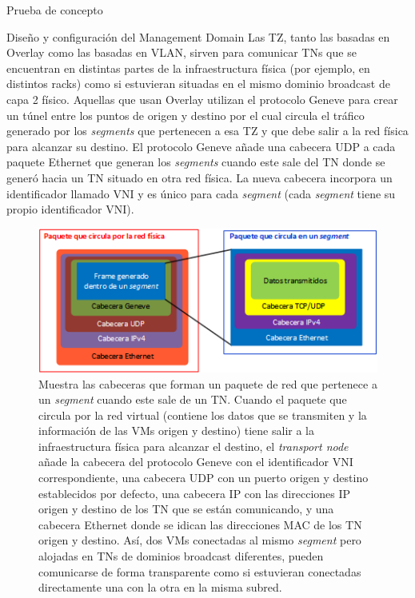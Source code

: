 \begin{section}{Prueba de concepto}
\begin{subsection}{Diseño y configuración del Management Domain}
    Las TZ, tanto las basadas en Overlay como las basadas en VLAN, sirven para comunicar TNs que se encuentran en distintas partes de la infraestructura física (por ejemplo, en distintos racks) como si estuvieran situadas en el mismo dominio broadcast de capa 2 físico. 
    Aquellas que usan Overlay utilizan el protocolo Geneve para crear un túnel entre los puntos de origen y destino por el cual circula el tráfico generado por los \textit{segments} que pertenecen a esa TZ y que debe salir a la red física para alcanzar su destino. El protocolo Geneve añade una cabecera UDP a cada paquete Ethernet que generan los \textit{segments} cuando este sale del TN donde se generó hacia un TN situado en otra red física. La nueva cabecera incorpora un identificador llamado VNI y es único para cada \textit{segment} (cada \textit{segment} tiene su propio identificador VNI). 
    \begin{figure}[h]
      \centering
      \includegraphics[width=1\textwidth]{imaxes/pruebaconcepto/FrameGeneve.png}
      \caption{Muestra las cabeceras que forman un paquete de red que pertenece a un \textit{segment} cuando este sale de un TN. Cuando el paquete que circula por la red virtual (contiene los datos que se transmiten y la información de las VMs origen y destino) tiene salir a la infraestructura física para alcanzar el destino, el \textit{transport node} añade la cabecera del protocolo Geneve con el identificador VNI correspondiente, una cabecera UDP con un puerto origen y destino establecidos por defecto, una cabecera IP con las direcciones IP origen y destino de los TN que se están comunicando, y una cabecera Ethernet donde se idican las direcciones MAC de los TN origen y destino. Así, dos VMs conectadas al mismo \textit{segment} pero alojadas en TNs de dominios broadcast diferentes, pueden comunicarse de forma transparente como si estuvieran conectadas directamente una con la otra en la misma subred.}
      \label{fig:Frame-Geneve-Segment-NSXT}
    \end{figure}

\end{subsection}
\end{section}
